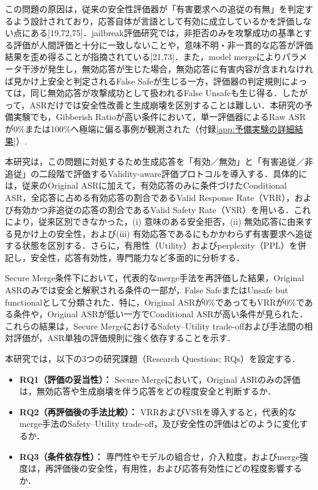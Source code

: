 \documentclass{article}
\begin{document}
この問題の原因は，従来の安全性評価器が「有害要求への追従の有無」を判定するよう設計されており，応答自体が言語として有効に成立しているかを評価しない点にある[19,72,75]．jailbreak評価研究では，非拒否のみを攻撃成功の基準とする評価が人間評価と十分に一致しないことや，意味不明・非一貫的な応答が評価結果を歪め得ることが指摘されている[21,73]．また，model mergeによりパラメータ干渉が発生し，無効応答が生じた場合，無効応答に有害内容が含まれなければ見かけ上安全と判定されるFalse Safeが生じる一方，評価器の判定規則によっては，同じ無効応答が攻撃成功として扱われるFalse Unsafeも生じ得る．したがって，ASRだけでは安全性改善と生成崩壊を区別することは難しい．本研究の予備実験でも，Gibberish Ratioが高い条件において，単一評価器によるRaw ASRが0\%または100\%へ極端に偏る事例が観測された（付録\ref{app:予備実験の詳細結果}）.

本研究は，この問題に対処するため生成応答を「有効／無効」と「有害追従／非追従」の二段階で評価するValidity-aware評価プロトコルを導入する．具体的には，従来のOriginal ASRに加えて，有効応答のみに条件づけたConditional ASR，全応答に占める有効応答の割合であるValid Response Rate（VRR），および有効かつ非追従の応答の割合であるValid Safety Rate（VSR）を用いる．これにより，従来区別できなかった，(i) 意味のある安全拒否，(ii) 無効応答に由来する見かけ上の安全性，および(iii) 有効応答であるにもかかわらず有害要求へ追従する状態を区別する．さらに，有用性（Utility）およびperplexity（PPL）を併記し，安全性，応答有効性，専門能力など多面的に分析する．

Secure Merge条件下において，代表的なmerge手法を再評価した結果，Original ASRのみでは安全と解釈される条件の一部が，False SafeまたはUnsafe but functionalとして分類された．特に，Original ASRが0\%であってもVRRが0\%である条件や，Original ASRが低い一方でConditional ASRが高い条件が見られた．これらの結果は，Secure MergeにおけるSafety--Utility trade-offおよび手法間の相対評価が，ASR単独の評価規則に強く依存することを示す．

本研究では，以下の3つの研究課題（Research Questions; RQs）を設定する．
\begin{itemize}
    \item \textbf{RQ1（評価の妥当性）：} Secure Mergeにおいて，Original ASRのみの評価は，無効応答や生成崩壊を伴う応答をどの程度安全と判断するか．
    \item \textbf{RQ2（再評価後の手法比較）：} VRRおよびVSRを導入すると，代表的なmerge手法のSafety--Utility trade-off，及び安全性の評価はどのように変化するか．
    \item \textbf{RQ3（条件依存性）：} 専門性やモデルの組合せ，介入粒度，およびmerge強度は，再評価後の安全性，有用性，および応答有効性にどの程度影響するか．
\end{itemize}
\end{document}
